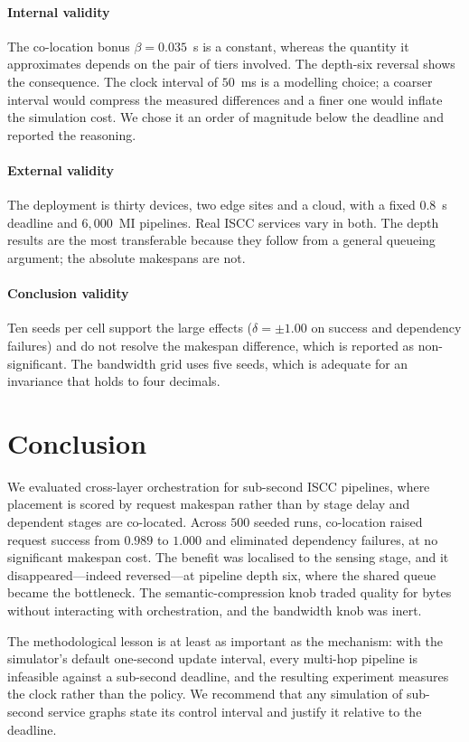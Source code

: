 \documentclass[journal,10pt]{IEEEtran}
\begin{document}
\paragraph{Internal validity}
The co-location bonus $\beta=0.035$~s is a constant, whereas the quantity it
approximates depends on the pair of tiers involved. The depth-six reversal
shows the consequence. The clock interval of $50$~ms is a modelling choice; a
coarser interval would compress the measured differences and a finer one would
inflate the simulation cost. We chose it an order of magnitude below the
deadline and reported the reasoning.

\paragraph{External validity}
The deployment is thirty devices, two edge sites and a cloud, with a fixed
$0.8$~s deadline and $6{,}000$~MI pipelines. Real ISCC services vary in both.
The depth results are the most transferable because they follow from a general
queueing argument; the absolute makespans are not.

\paragraph{Conclusion validity}
Ten seeds per cell support the large effects ($\delta=\pm1.00$ on success and
dependency failures) and do not resolve the makespan difference, which is
reported as non-significant. The bandwidth grid uses five seeds, which is
adequate for an invariance that holds to four decimals.

\section{Conclusion}
\label{sec:concl}

We evaluated cross-layer orchestration for sub-second ISCC pipelines, where
placement is scored by request makespan rather than by stage delay and
dependent stages are co-located. Across $500$ seeded runs, co-location raised
request success from $0.989$ to $1.000$ and eliminated dependency failures, at
no significant makespan cost. The benefit was localised to the sensing stage,
and it disappeared---indeed reversed---at pipeline depth six, where the shared
queue became the bottleneck. The semantic-compression knob traded quality for
bytes without interacting with orchestration, and the bandwidth knob was inert.

The methodological lesson is at least as important as the mechanism: with the
simulator's default one-second update interval, every multi-hop pipeline is
infeasible against a sub-second deadline, and the resulting experiment measures
the clock rather than the policy. We recommend that any simulation of
sub-second service graphs state its control interval and justify it relative to
the deadline.

\balance


\end{document}
